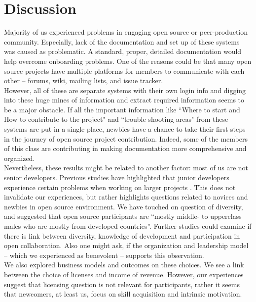 \section{Discussion}
\label{discussion}

Majority of us experienced problems in engaging open source or peer-production community. Especially, lack of the documentation and set up of these systems was caused as problematic. A standard, proper, detailed documentation  would help overcome onboarding problems. One of the reasons could be that many open source projects have multiple platforms for members to communicate with each other -- forums, wiki, mailing lists, and issue tracker.\\

\noindent However, all of these are separate systems with their own login info and digging into these huge mines of information and extract required information seems to be a major obstacle. If all the important information like ``Where to start and How to contribute to the project" and ``trouble shooting areas" from these systems are put in a single place,  newbies have a chance to take their first steps in the journey of open source project contribution. Indeed, some of the members of this class are contributing in making documentation more comprehensive and organized.\\

\noindent Nevertheless, these results might be related to another factor: most of us are not senior developers. Previous studies have highlighted that junior developers experience certain problems when working on larger projects \cite{Begel2008}. This does not invalidate our experiences, but rather highlights questions related to novices and newbies in open source environment. We have touched on question of diversity, and suggested that open source participants are ``mostly middle- to upperclass males who are mostly from developed countries''. Further studies could examine if there is link between diversity, knowledge of development and participation in open collaboration. Also one might ask, if the organization and leadership model -- which we experienced as benevolent -- supports this observation.\\

\noindent We also explored business models and outcomes on these choices. We see a link between the choice of licenses and income of revenue. However, our experiences suggest that licensing question is not relevant for participants, rather it seems that newcomers, at least us,  focus on skill acquisition and intrinsic motivation.

